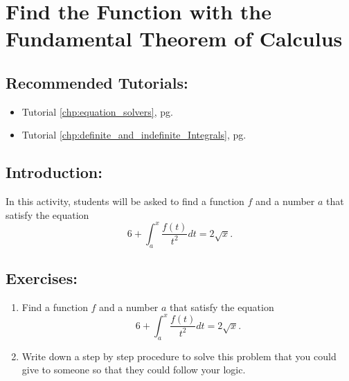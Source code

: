 \section{Find the Function with the Fundamental Theorem of Calculus}
\label{sec:an_interesting_function_problem}	

\subsection*{Recommended Tutorials:}
\begin{itemize}
	\item Tutorial \ref{chp:equation_solvers}, pg. \pageref{chp:equation_solvers}
	\item Tutorial \ref{chp:definite_and_indefinite_Integrals}, pg. \pageref{chp:definite_and_indefinite_Integrals}
\end{itemize}

\subsection*{Introduction:}

In this activity, students will be asked to find a function $f$ and a number $a$ that satisfy the equation \[6 + \displaystyle\int_{a}^x \dfrac{f(t)}{t^2} dt = 2\sqrt{x}.\]

\subsection*{Exercises:}

\begin{enumerate}
    \item   Find a function $f$ and a number $a$ that satisfy the equation \[6 + \displaystyle\int_{a}^x \dfrac{f(t)}{t^2} dt = 2\sqrt{x}.\]
    \item   Write down a step by step procedure to solve this problem that you could give to someone so that they could follow your logic.
\end{enumerate}
